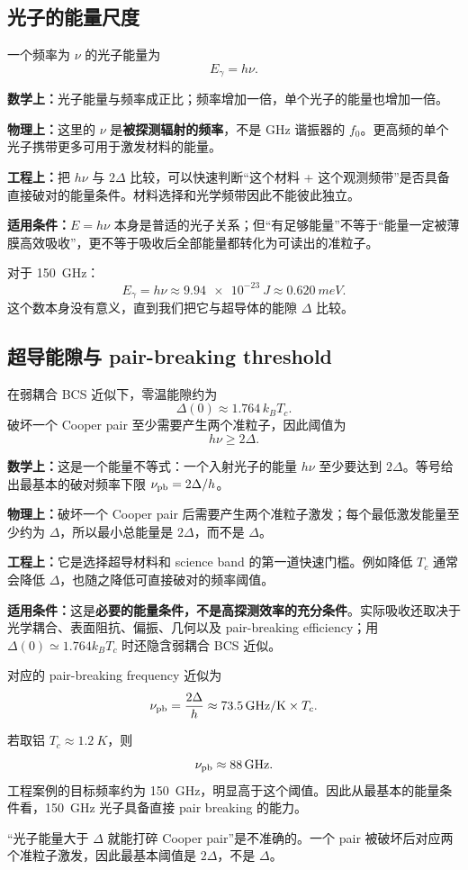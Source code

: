 \documentclass[11pt,a4paper,openany]{ctexrep}
\newcommand{\formulaexplain}[4]{%
\begin{formulaguidebox}
\textbf{\color{KidBlue}数学上：}#1\par
\textbf{\color{KidTeal}物理上：}#2\par
\textbf{\color{KidGold!55!black}工程上：}#3\par
\textbf{\color{KidRed}适用条件：}#4
\end{formulaguidebox}%
}
\begin{document}
\subsection{光子的能量尺度}
一个频率为 $\nu$ 的光子能量为
\[
E_\gamma=h\nu.
\]
\formulaexplain
{光子能量与频率成正比；频率增加一倍，单个光子的能量也增加一倍。}
{这里的 $\nu$ 是\textbf{被探测辐射的频率}，不是 GHz 谐振器的 $f_0$。更高频的单个光子携带更多可用于激发材料的能量。}
{把 $h\nu$ 与 $2\Delta$ 比较，可以快速判断“这个材料 + 这个观测频带”是否具备直接破对的能量条件。材料选择和光学频带因此不能彼此独立。}
{$E=h\nu$ 本身是普适的光子关系；但“有足够能量”不等于“能量一定被薄膜高效吸收”，更不等于吸收后全部能量都转化为可读出的准粒子。}
对于 \SI{150}{GHz}：
\[
E_\gamma = h\nu \approx \SI{9.94e-23}{J}\approx \SI{0.620}{meV}.
\]
这个数本身没有意义，直到我们把它与超导体的能隙 $\Delta$ 比较。

\subsection{超导能隙与 pair-breaking threshold}
在弱耦合 BCS 近似下，零温能隙约为
\[
\Delta(0)\approx1.764\,k_B T_c.
\]
破坏一个 Cooper pair 至少需要产生两个准粒子，因此阈值为
\[
\boxed{h\nu\ge 2\Delta.}
\]
\formulaexplain
{这是一个能量不等式：一个入射光子的能量 $h\nu$ 至少要达到 $2\Delta$。等号给出最基本的破对频率下限 $\nu_{\rm pb}=2\Delta/h$。}
{破坏一个 Cooper pair 后需要产生两个准粒子激发；每个最低激发能量至少约为 $\Delta$，所以最小总能量是 $2\Delta$，而不是 $\Delta$。}
{它是选择超导材料和 science band 的第一道快速门槛。例如降低 $T_c$ 通常会降低 $\Delta$，也随之降低可直接破对的频率阈值。}
{这是\textbf{必要的能量条件，不是高探测效率的充分条件}。实际吸收还取决于光学耦合、表面阻抗、偏振、几何以及 pair-breaking efficiency；用 $\Delta(0)\simeq1.764k_BT_c$ 时还隐含弱耦合 BCS 近似。}
对应的 pair-breaking frequency 近似为
\[
\nu_{\rm pb}=\frac{2\Delta}{h}\approx \SI{73.5}{GHz/K}\times T_c.
\]

\begin{projectbox}
若取铝 $T_c\approx\SI{1.2}{K}$，则
\[
\nu_{\rm pb}\approx\SI{88}{GHz}.
\]
工程案例的目标频率约为 \SI{150}{GHz}，明显高于这个阈值。因此从最基本的能量条件看，\SI{150}{GHz} 光子具备直接 pair breaking 的能力。
\end{projectbox}

\begin{mistakebox}
“光子能量大于 $\Delta$ 就能打碎 Cooper pair”是不准确的。一个 pair 被破坏后对应两个准粒子激发，因此最基本阈值是 $2\Delta$，不是 $\Delta$。
\end{mistakebox}
\end{document}
